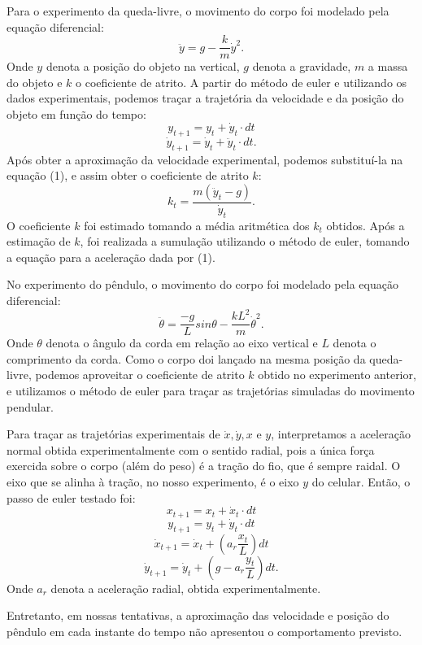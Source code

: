\documentclass{article}
\begin{document}
Para o experimento da queda-livre, o movimento do corpo foi modelado pela equação diferencial: \begin{equation}\ddot{y} = g - \dfrac{k}{m}\dot{y}^2.\end{equation}
Onde $y$ denota a posição do objeto na vertical, $g$ denota a gravidade, $m$ a massa do objeto e $k$ o coeficiente de atrito. A partir do método de euler e utilizando os dados experimentais, podemos traçar a trajetória da velocidade e da posição do objeto em função do tempo: $$y_{t+1} = y_t + \dot{y}_t\cdot dt $$$$ \dot{y}_{t+1} = \dot{y}_t + \ddot{y}_t \cdot dt.$$
Após obter a aproximação da velocidade experimental, podemos substituí-la na equação (1), e assim obter o coeficiente de atrito $k$: $$k_t = \dfrac{m(\ddot{y}_t - g)}{\dot{y}_t}.$$
O coeficiente $k$ foi estimado tomando a média aritmética dos $k_t$ obtidos. Após a estimação de $k$, foi realizada a sumulação utilizando o método de euler, tomando a equação para a aceleração dada por (1).

No experimento do pêndulo, o movimento do corpo foi modelado pela equação diferencial: \begin{equation} \ddot{\theta} = \dfrac{-g}{L}sin{\theta} - \dfrac{kL^2}{m}\dot{\theta}^2.\end{equation}
Onde $\theta$ denota o ângulo da corda em relação ao eixo vertical e $L$ denota o comprimento da corda. Como o corpo doi lançado na mesma posição da queda-livre, podemos aproveitar o coeficiente de atrito $k$ obtido no experimento anterior, e utilizamos o método de euler para traçar as trajetórias simuladas do movimento pendular.

Para traçar as trajetórias experimentais de $\dot{x}, \dot{y}, x$ e $y$, interpretamos a aceleração normal obtida experimentalmente com o sentido radial, pois a única força exercida sobre o corpo (além do peso) é a tração do fio, que é sempre raidal. O eixo que se alinha à tração, no nosso experimento, é o eixo $y$ do celular. Então, o passo de euler testado foi: $$x_{t+1} = x_t + \dot{x}_t\cdot dt$$ $$y_{t+1} = y_t + \dot{y}_t \cdot dt$$ $$\dot{x}_{t+1} = \dot{x}_t + \left( a_r \dfrac{x_t}{L}\right) dt$$ $$\dot{y}_{t+1} = \dot{y}_t + \left( g - a_r \dfrac{y_t}{L}\right) dt.$$
Onde $a_r$ denota a aceleração radial, obtida experimentalmente.

Entretanto, em nossas tentativas, a aproximação das velocidade e posição do pêndulo em cada instante do tempo não apresentou o comportamento previsto.\\
\end{document}
